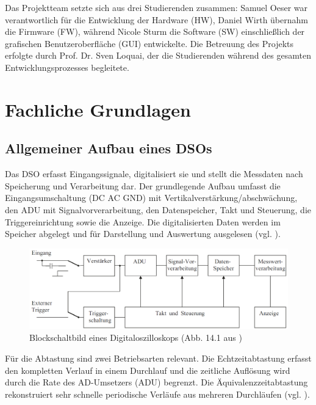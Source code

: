 \documentclass[a4paper, portrait, 12pt]{scrartcl} %
\begin{document}
Das Projektteam setzte sich aus drei Studierenden zusammen: Samuel Oeser war verantwortlich für die Entwicklung der Hardware (HW), Daniel Wirth übernahm die Firmware (FW), während Nicole Sturm die Software (SW) einschließlich der grafischen Benutzeroberfläche (GUI) entwickelte. Die Betreuung des Projekts erfolgte durch Prof. Dr. Sven Loquai, der die Studierenden während des gesamten Entwicklungsprozesses begleitete.
\pagebreak

\section{Fachliche Grundlagen}

\subsection{Allgemeiner Aufbau eines DSOs}
\label{subsec:oscilloscope_func}
Das DSO erfasst Eingangssignale, digitalisiert sie und stellt die Messdaten nach Speicherung und Verarbeitung dar. Der grundlegende Aufbau umfasst die Eingangsumschaltung (DC AC GND) mit Vertikalverstärkung/abschwächung, den ADU mit Signalvorverarbeitung, den Datenspeicher, Takt und Steuerung, die Triggereinrichtung sowie die Anzeige. Die digitalisierten Daten werden im Speicher abgelegt und für Darstellung und Auswertung ausgelesen (vgl. \cite[S. 216]{Muehl2020}).

\begin{figure}[H]
	\centering
    \includegraphics[scale=0.4]{block_diagram_oscilloscope_muehl.png} 
	\caption{Blockschaltbild eines Digitaloszilloskops (Abb. 14.1 aus \cite[S. 216]{Muehl2020})}
	\label{fig:blockdiagram_oscilloscope}
\end{figure}

Für die Abtastung sind zwei Betriebsarten relevant. Die Echtzeitabtastung erfasst den kompletten Verlauf in einem Durchlauf und die zeitliche Auflösung wird durch die Rate des AD-Umsetzers (ADU) begrenzt. Die Äquivalenzzeitabtastung rekonstruiert sehr schnelle periodische Verläufe aus mehreren Durchläufen (vgl. \cite[S. 216]{Muehl2020}).
\end{document}

